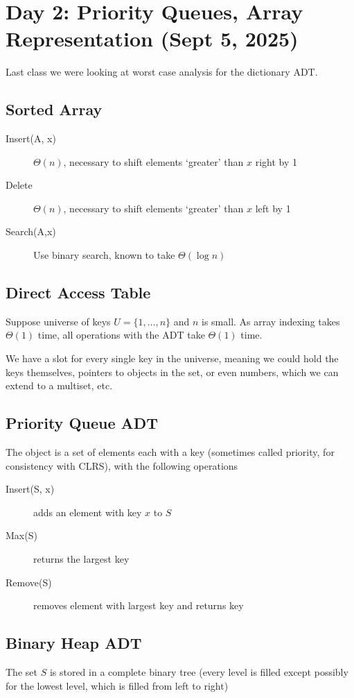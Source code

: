 \section{Day 2: Priority Queues, Array Representation (Sept 5, 2025)}

Last class we were looking at worst case analysis for the dictionary ADT.

\subsection*{Sorted Array}
\begin{description}
    \item[Insert(A, x)] $\Theta(n)$, necessary to shift elements `greater' than $x$ right by 1 
    \item[Delete] $\Theta(n)$, necessary to shift elements `greater' than $x$ left by 1 
    \item[Search(A,x)] Use binary search, known to take $\Theta(\log n)$
\end{description}

\subsection*{Direct Access Table}
Suppose universe of keys $U = \{ 1, \dots, n \}$ and $n$ is small. As array indexing takes $\Theta(1)$ time, all operations with the ADT take $\Theta(1)$ time. 

We have a slot for every single key in the universe, meaning we could hold the keys themselves, pointers to objects in the set, or even numbers, which we can extend to a multiset, etc.

\subsection{Priority Queue ADT}
The object is a set of elements each with a key (sometimes called priority, for consistency with CLRS), with the following operations
\begin{description}
    \item[Insert(S, x)] adds an element with key $x$ to $S$ 
    \item[Max(S)] returns the largest key
    \item[Remove(S)] removes element with largest key and returns key
\end{description}

\subsection{Binary Heap ADT}
The set $S$ is stored in a complete binary tree (every level is filled except possibly for the lowest level, which is filled from left to right)

